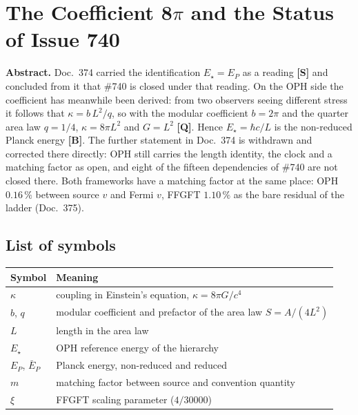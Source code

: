 \providecommand{\BM}{\textbf{[B]}}
\providecommand{\KM}{\textbf{[K]}}
\providecommand{\SM}{\textbf{[S]}}
\providecommand{\XM}{\textbf{[X]}}
\providecommand{\QM}{\textbf{[Q]}}

\chapter*{The Coefficient 8$\pi$ and the Status of Issue 740}

{\small\noindent\textbf{Abstract.}\quad\ignorespaces
Doc.~374 carried the identification $E_\star=E_P$ as a reading \SM{} and
concluded from it that \#740 is closed under that reading. On the OPH side the
coefficient has meanwhile been derived: from two observers seeing different
stress it follows that $\kappa=b\,L^2/q$, so with the modular coefficient
$b=2\pi$ and the quarter area law $q=1/4$, $\kappa=8\pi L^2$ and $G=L^2$ \QM.
Hence $E_\star=\hbar c/L$ is the non-reduced Planck energy \BM. The further
statement in Doc.~374 is withdrawn and corrected there directly: OPH still
carries the length identity, the
clock and a matching factor as open, and eight of the fifteen dependencies of
\#740 are not closed there. Both frameworks have a matching factor at the same
place: OPH $0.16\,\%$ between source $v$ and Fermi $v$, FFGFT $1.10\,\%$ as the
bare residual of the ladder (Doc.~375).
}\medskip

\section*{List of symbols}

\medskip


\medskip
\begin{tabular}{@{}lp{10cm}@{}}
\toprule
\textbf{Symbol} & \textbf{Meaning} \\
\midrule
$\kappa$ & coupling in Einstein's equation, $\kappa=8\pi G/c^4$ \\
$b$, $q$ & modular coefficient and prefactor of the area law $S=A/(4L^2)$ \\
$L$ & length in the area law \\
$E_\star$ & OPH reference energy of the hierarchy \\
$E_P$, $\bar E_P$ & Planck energy, non-reduced and reduced \\
$m$ & matching factor between source and convention quantity \\
$\xi$ & FFGFT scaling parameter ($4/30000$) \\
\bottomrule
\end{tabular}

